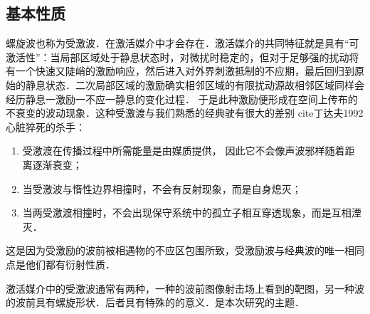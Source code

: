 \subsection{基本性质}
螺旋波也称为受激波．在激活媒介中才会存在．激活媒介的共同特征就是具有“可激活性”：当局部区域处于静息状态时，对微扰时稳定的，但对于足够强的扰动将有一个快速又陡峭的激励响应，然后进入对外界刺激抵制的不应期，最后回归到原始的静息状态．二次局部区域的激励确实相邻区域的有限扰动源故相邻区域同样会经历静息一激励一不应一静息的变化过程． 于是此种激励便形成在空间上传布的不衰变的波动现象．这种受激渡与我们熟悉的经典驶有很大的差别 cite{丁达夫1992心脏猝死的杀手}：
\begin{enumerate}
  \item 受激渡在传播过程中所需能量是由媒质提供， 因此它不会像声波邪样随着距离逐渐衰变；
  \item 当受激波与惰性边界相撞时，不会有反射现象，而是自身熄灭；
  \item 当两受激渡相撞时，不会出现保守系统中的孤立子相互穿透现象，而是互相湮灭．
\end{enumerate}
这是因为受激励的波前被相遇物的不应区包围所致，受激励波与经典波的唯一相同点是他们都有衍射性质．

激活媒介中的受激波通常有两种，一种的波前图像射击场上看到的靶图，另一种波的波前具有螺旋形状．后者具有特殊的的意义．是本次研究的主题．
